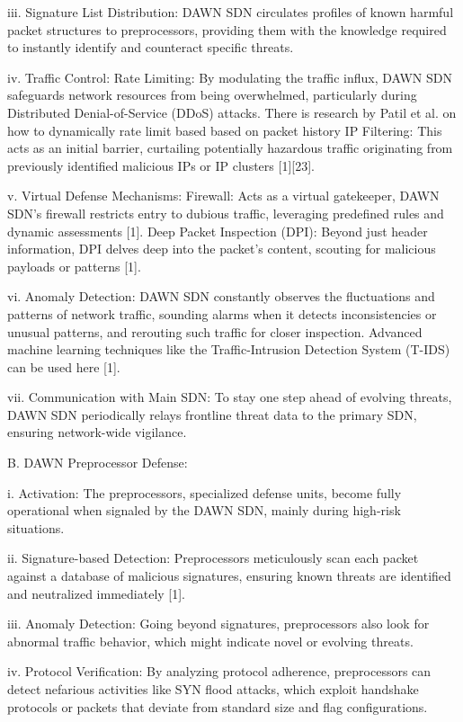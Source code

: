 \documentclass[conference]{IEEEtran}
\begin{document}
iii. Signature List Distribution:
DAWN SDN circulates profiles of known harmful packet structures to preprocessors, providing them with the knowledge required to instantly identify and counteract specific threats.

iv. Traffic Control:
Rate Limiting: By modulating the traffic influx, DAWN SDN safeguards network resources from being overwhelmed, particularly during Distributed Denial-of-Service (DDoS) attacks. There is research by Patil et al. on how to dynamically rate limit based based on packet history
IP Filtering: This acts as an initial barrier, curtailing potentially hazardous traffic originating from previously identified malicious IPs or IP clusters [1][23].

v. Virtual Defense Mechanisms:
Firewall: Acts as a virtual gatekeeper, DAWN SDN's firewall restricts entry to dubious traffic, leveraging predefined rules and dynamic assessments [1].
Deep Packet Inspection (DPI): Beyond just header information, DPI delves deep into the packet's content, scouting for malicious payloads or patterns [1].

vi. Anomaly Detection:
DAWN SDN constantly observes the fluctuations and patterns of network traffic, sounding alarms when it detects inconsistencies or unusual patterns, and rerouting such traffic for closer inspection. Advanced machine learning techniques like the Traffic-Intrusion Detection System (T-IDS) can be used here [1].

vii. Communication with Main SDN:
To stay one step ahead of evolving threats, DAWN SDN periodically relays frontline threat data to the primary SDN, ensuring network-wide vigilance. 

B. DAWN Preprocessor Defense:

i. Activation:
The preprocessors, specialized defense units, become fully operational when signaled by the DAWN SDN, mainly during high-risk situations.

ii. Signature-based Detection:
Preprocessors meticulously scan each packet against a database of malicious signatures, ensuring known threats are identified and neutralized immediately [1].

iii. Anomaly Detection:
Going beyond signatures, preprocessors also look for abnormal traffic behavior, which might indicate novel or evolving threats.

iv. Protocol Verification:
By analyzing protocol adherence, preprocessors can detect nefarious activities like SYN flood attacks, which exploit handshake protocols or packets that deviate from standard size and flag configurations.
\end{document}
